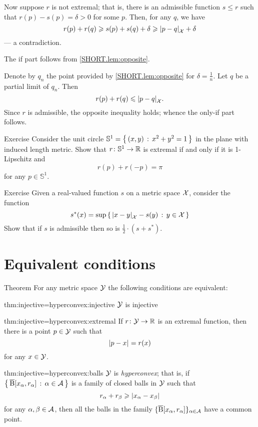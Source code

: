 Now suppose $r$ is not extremal; that is, there is an admissible function $s\le r$ such that $r(p)-s(p)=\delta>0$ for some $p$.
Then, for any $q$, we have
\[r(p)+r(q)\ge s(p)+s(q)+\delta\ge \dist{p}{q}{\spc{X}}+\delta\]
--- a contradiction.

The if part follows from \ref{SHORT.lem:opposite}.

Denote by $q_n$ the point provided by \ref{SHORT.lem:opposite} for $\delta=\tfrac1n$.
Let $q$ be a partial limit of $q_n$. 
Then 
\[r(p)+r(q)\le\dist{p}{q}{\spc{X}}.\]
Since $r$ is admissible, the opposite inequality holds;
whence the only-if part follows.
\qeds

\begin{thm}{Exercise}\label{ex:circle}
Consider the unit circle $\mathbb{S}^1=\left\{\,{(x,y)}\,:\,{x^2+y^2=1}\,\right\}$ in the plane with induced length metric.
Show that $r\colon\mathbb{S}^1\to\mathbb{R}$ is extremal if and only if it is 1-Lipschitz and 
\[r(p)+r(-p)=\pi\] for any $p\in\mathbb{S}^1$.
\end{thm}

\begin{thm}{Exercise}\label{ex:retraction}
Given a real-valued function $s$ on a metric space $\mathcal{X}$,
consider the function
\[s^*(x)=\sup\set{\dist{x}{y}{\spc{X}}-s(y)}{y\in \spc{X}}\]
Show that if $s$ is admissible then so is $\tfrac12\cdot(s+s^*)$.
\end{thm}

\section{Equivalent conditions}

\begin{thm}{Theorem}\label{thm:injective=hyperconvex}
For any metric space $\mathcal{Y}$ the following conditions are equivalent:

\begin{subthm}{thm:injective=hyperconvex:injective}
$\mathcal{Y}$ is injective
\end{subthm}


\begin{subthm}{thm:injective=hyperconvex:extremal}
If $r\colon\mathcal{Y}\to\mathbb{R}$ is an extremal function, then there is a point $p\in \mathcal{Y}$ such that 
\[\dist{p}{x}{}= r(x)\]
for any $x\in \mathcal{Y}$.
\end{subthm}

\begin{subthm}{thm:injective=hyperconvex:balls}
$\mathcal{Y}$ is \emph{hyperconvex};
that is, if $\left\{\,{\overline{\mathrm{B}}{}[x_\alpha,r_\alpha]}\,:\,{\alpha\in\mathcal{A}}\,\right\}$ is a family of closed balls in $\mathcal{Y}$ such that 
 \[r_\alpha+r_\beta\ge \dist{x_\alpha}{x_\beta}{}\]
 for any $\alpha,\beta\in \mathcal{A}$, then all the balls in the family $\{\overline{\mathrm{B}}{}[x_\alpha,r_\alpha]\}_{\alpha\in\mathcal{A}}$ have a common point.
\end{subthm}

\end{thm}

